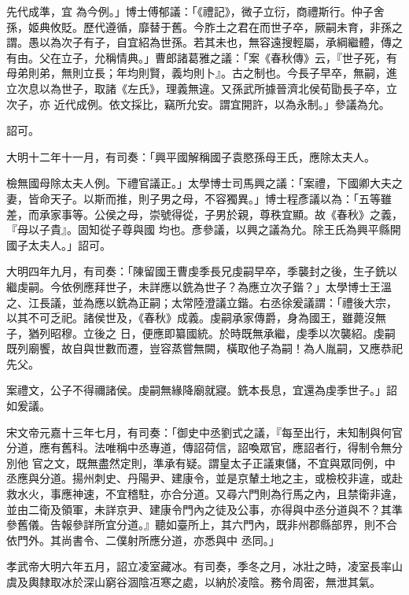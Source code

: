 \begin{pinyinscope}
 先代成準，宜
 為今例。」博士傅郁議：「《禮記》，微子立衍，商禮斯行。仲子舍孫，姬典攸貶。歷代遵循，靡替于舊。今胙土之君在而世子卒，厥嗣未育，非孫之謂。愚以為次子有子，自宜紹為世孫。若其未也，無容遠搜輕屬，承綱繼體，傳之有由。父在立子，允稱情典。」曹郎諸葛雅之議：「案《春秋傳》云，『世子死，有母弟則弟，無則立長；年均則賢，義均則卜』。古之制也。今長子早卒，無嗣，進立次息以為世子，取諸《左氏》，理義無違。又孫武所據晉濟北侯荀勖長子卒，立次子，亦
 近代成例。依文採比，竊所允安。謂宜開許，以為永制。」參議為允。



 詔可。



 大明十二年十一月，有司奏：「興平國解稱國子袁愍孫母王氏，應除太夫人。



 檢無國母除太夫人例。下禮官議正。」太學博士司馬興之議：「案禮，下國卿大夫之妻，皆命天子。以斯而推，則子男之母，不容獨異。」博士程彥議以為：「五等雖差，而承家事等。公侯之母，崇號得從，子男於親，尊秩宜顯。故《春秋》之義，『母以子貴』。固知從子尊與國
 均也。彥參議，以興之議為允。除王氏為興平縣開國子太夫人。」詔可。



 大明四年九月，有司奏：「陳留國王曹虔季長兄虔嗣早卒，季襲封之後，生子銑以繼虔嗣。今依例應拜世子，未詳應以銑為世子？為應立次子鍇？」太學博士王溫之、江長議，並為應以銑為正嗣；太常陸澄議立鍇。右丞徐爰議謂：「禮後大宗，以其不可乏祀。諸侯世及，《春秋》成義。虔嗣承家傳爵，身為國王，雖薨沒無子，猶列昭穆。立後之
 日，便應即纂國統。於時既無承繼，虔季以次襲紹。虔嗣既列廟饗，故自與世數而遷，豈容蒸嘗無闕，橫取他子為嗣！為人胤嗣，又應恭祀先父。



 案禮文，公子不得禰諸侯。虔嗣無緣降廟就寢。銑本長息，宜還為虔季世子。」詔如爰議。



 宋文帝元嘉十三年七月，有司奏：「御史中丞劉式之議，『每至出行，未知制與何官分道，應有舊科。法唯稱中丞專道，傳詔荷信，詔喚眾官，應詔者行，得制令無分別他
 官之文，既無盡然定則，準承有疑。謂皇太子正議東儲，不宜與眾同例，中丞應與分道。揚州刺史、丹陽尹、建康令，並是京輦土地之主，或檢校非違，或赴救水火，事應神速，不宜稽駐，亦合分道。又尋六門則為行馬之內，且禁衛非違，並由二衛及領軍，未詳京尹、建康令門內之徒及公事，亦得與中丞分道與不？其準參舊儀。告報參詳所宜分道。』聽如臺所上，其六門內，既非州郡縣部界，則不合依門外。其尚書令、二僕射所應分道，亦悉與中
 丞同。」



 孝武帝大明六年五月，詔立凌室藏冰。有司奏，季冬之月，冰壯之時，凌室長率山虞及輿隸取冰於深山窮谷涸陰冱寒之處，以納於凌陰。務令周密，無泄其氣。




\end{pinyinscope}
